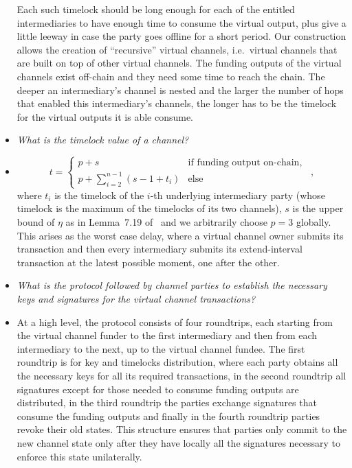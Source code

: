 \begin{itemize}
  Each such timelock should be long enough for each of the entitled
  intermediaries to have enough time to consume the virtual output, plus give a
  little leeway in case the party goes offline for a short period. Our
  construction allows the creation of ``recursive'' virtual channels, i.e.\
  virtual channels that are built on top of other virtual channels. The funding
  outputs of the virtual channels exist off-chain and they need some time to
  reach the chain. The deeper an intermediary's channel is nested and the larger
  the number of hops that enabled this intermediary's channels, the longer has
  to be the timelock for the virtual outputs it is able consume.
  \item \emph{What is the timelock value of a channel?}
  \item
  \begin{equation}
    t =
      \begin{cases}
        p + s & \mbox{if funding output on-chain}, \\
        p + \sum\limits_{i = 2}^{n-1}(s - 1 + t_i) & \mbox{else}
      \end{cases} \enspace,
  \end{equation}
  where $t_i$ is the timelock of the $i$-th underlying intermediary party (whose
  timelock is the maximum of the timelocks of its two channels), $s$ is the
  upper bound of $\eta$ as in Lemma~7.19 of~\cite{BMTZ17} and we arbitrarily
  choose $p = 3$ globally. This arises as the worst case delay, where a virtual
  channel owner submits its transaction and then every intermediary submits its
  extend-interval transaction at the latest possible moment, one after the
  other.
  \item \emph{What is the protocol followed by channel parties to establish the
  necessary keys and signatures for the virtual channel transactions?}
  \item At a high level, the protocol consists of four roundtrips, each starting
  from the virtual channel funder to the first intermediary and then from each
  intermediary to the next, up to the virtual channel fundee. The first
  roundtrip is for key and timelocks distribution, where each party obtains all
  the necessary keys for all its required transactions, in the second roundtrip
  all signatures except for those needed to consume funding outputs are
  distributed, in the third roundtrip the parties exchange signatures that
  consume the funding outputs and finally in the fourth roundtrip parties revoke
  their old states. This structure ensures that parties only commit to the new
  channel state only after they have locally all the signatures necessary to
  enforce this state unilaterally.
\end{itemize}
